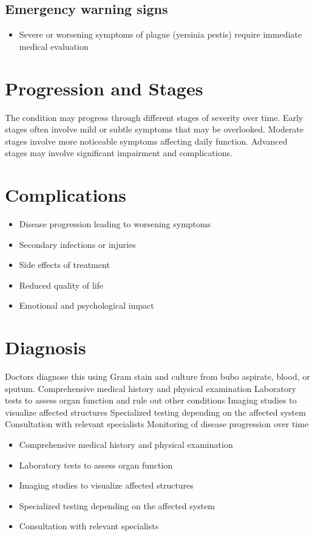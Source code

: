 \subsection{Emergency warning signs}
\begin{itemize}[noitemsep]
  \item Severe or worsening symptoms of plague (yersinia pestis) require immediate medical evaluation
\end{itemize}
\section{Progression and Stages}
The condition may progress through different stages of severity over time. Early stages often involve mild or subtle symptoms that may be overlooked. Moderate stages involve more noticeable symptoms affecting daily function. Advanced stages may involve significant impairment and complications.
\section{Complications}
\begin{itemize}[noitemsep]
  \item Disease progression leading to worsening symptoms
  \item Secondary infections or injuries
  \item Side effects of treatment
  \item Reduced quality of life
  \item Emotional and psychological impact
\end{itemize}
\section{Diagnosis}
Doctors diagnose this using Gram stain and culture from bubo aspirate, blood, or sputum. Comprehensive medical history and physical examination Laboratory tests to assess organ function and rule out other conditions Imaging studies to visualize affected structures Specialized testing depending on the affected system Consultation with relevant specialists Monitoring of disease progression over time

\begin{itemize}[noitemsep]
  \item Comprehensive medical history and physical examination
  \item Laboratory tests to assess organ function
  \item Imaging studies to visualize affected structures
  \item Specialized testing depending on the affected system
  \item Consultation with relevant specialists
\end{itemize}

